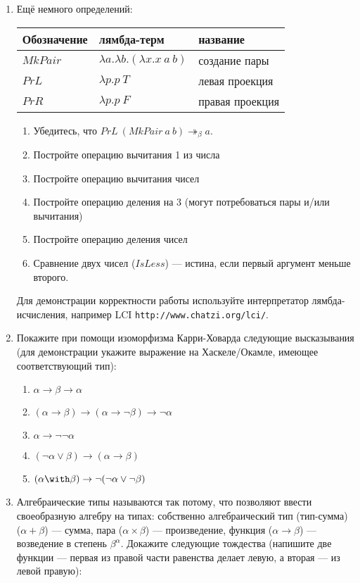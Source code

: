 \documentclass[10pt,a4paper,oneside]{article}
\begin{document}
\begin{enumerate}
\item Ещё немного определений:

\begin{tabular}{lll}
Обозначение & лямбда-терм & название\\\hline
$MkPair$ & $\lambda a.\lambda b.(\lambda x.x\ a\ b)$ & создание пары\\
$PrL$ & $\lambda p.p\ T$ & левая проекция\\
$PrR$ & $\lambda p.p\ F$ & правая проекция\\\hline
\end{tabular}

\begin{enumerate}
\item Убедитесь, что $PrL\ (MkPair\ a\ b) \twoheadrightarrow_\beta a$.
\item Постройте операцию вычитания 1 из числа
\item Постройте операцию вычитания чисел
\item Постройте операцию деления на 3 (могут потребоваться пары и/или вычитания)
\item Постройте операцию деления чисел
\item Сравнение двух чисел ($IsLess$) — истина, если первый аргумент меньше второго.
\end{enumerate}

Для демонстрации
корректности работы используйте интерпретатор лямбда-исчисления, например
LCI \texttt{http://www.chatzi.org/lci/}.

\item Покажите при помощи изоморфизма Карри-Ховарда следующие высказывания (для
демонстрации укажите выражение на Хаскеле/Окамле, имеющее соответствующий тип):
\begin{enumerate}
\item $\alpha\rightarrow\beta\rightarrow\alpha$
\item $(\alpha\rightarrow\beta)\rightarrow(\alpha\rightarrow\neg\beta)\rightarrow\neg\alpha$
\item $\alpha\rightarrow\neg\neg\alpha$
\item $(\neg\alpha\vee\beta)\rightarrow(\alpha\rightarrow\beta)$
\item $(\alpha\with\beta)\rightarrow\neg(\neg\alpha\vee\neg\beta)$
\end{enumerate}

\item Алгебраические типы называются так потому, что позволяют ввести своеобразную
алгебру на типах: собственно алгебраический тип (тип-сумма) ($\alpha + \beta$) --- сумма, 
пара ($\alpha \times \beta$) --- произведение, функция
($\alpha \rightarrow \beta$) --- возведение в степень $\beta^\alpha$.
Докажите следующие тождества (напишите две функции --- первая из правой части 
равенства делает левую, а вторая --- из левой правую):


\end{enumerate}
\end{document}

